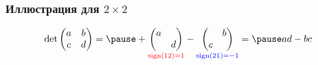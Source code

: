 \begin{frame}
    \frametitle{Иллюстрация для $2\times 2$}

    \[
    \det \begin{pmatrix}
        a & b \\
        c & d \\
    \end{pmatrix} = \pause
    +\underset{\red{\sign(12)=1}}{\begin{pmatrix}
        a &  \\
         & d \\
    \end{pmatrix}} - 
    \underset{\textcolor{blue}{\sign(21)=-1}}{\begin{pmatrix}
         & b \\
        c &  \\
    \end{pmatrix}} = \pause  ad - bc
    \]

\end{frame}



